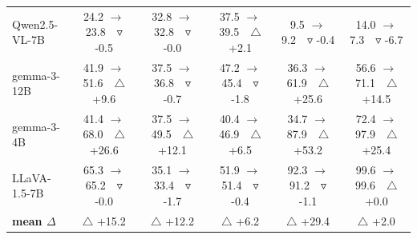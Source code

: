 \begin{table}[h]
\begin{tabular}{lccccc}
Qwen2.5-VL-7B & 24.2 $\to$ 23.8~~\textcolor{green!60!black}{$\triangledown$ -0.5} & 32.8 $\to$ 32.8~~\textcolor{green!60!black}{$\triangledown$ -0.0} & 37.5 $\to$ 39.5~~\textcolor{red!70!black}{$\triangle$ +2.1} & 9.5 $\to$ 9.2~~\textcolor{green!60!black}{$\triangledown$ -0.4} & 14.0 $\to$ 7.3~~\textcolor{green!60!black}{$\triangledown$ -6.7} \\
gemma-3-12B & 41.9 $\to$ 51.6~~\textcolor{red!70!black}{$\triangle$ +9.6} & 37.5 $\to$ 36.8~~\textcolor{green!60!black}{$\triangledown$ -0.7} & 47.2 $\to$ 45.4~~\textcolor{green!60!black}{$\triangledown$ -1.8} & 36.3 $\to$ 61.9~~\textcolor{red!70!black}{$\triangle$ +25.6} & 56.6 $\to$ 71.1~~\textcolor{red!70!black}{$\triangle$ +14.5} \\
gemma-3-4B & 41.4 $\to$ 68.0~~\textcolor{red!70!black}{$\triangle$ +26.6} & 37.5 $\to$ 49.5~~\textcolor{red!70!black}{$\triangle$ +12.1} & 40.4 $\to$ 46.9~~\textcolor{red!70!black}{$\triangle$ +6.5} & 34.7 $\to$ 87.9~~\textcolor{red!70!black}{$\triangle$ +53.2} & 72.4 $\to$ 97.9~~\textcolor{red!70!black}{$\triangle$ +25.4} \\
LLaVA-1.5-7B & 65.3 $\to$ 65.2~~\textcolor{green!60!black}{$\triangledown$ -0.0} & 35.1 $\to$ 33.4~~\textcolor{green!60!black}{$\triangledown$ -1.7} & 51.9 $\to$ 51.4~~\textcolor{green!60!black}{$\triangledown$ -0.4} & 92.3 $\to$ 91.2~~\textcolor{green!60!black}{$\triangledown$ -1.1} & 99.6 $\to$ 99.6~~\textcolor{red!70!black}{$\triangle$ +0.0} \\
\midrule
\textbf{mean $\Delta$} & \textcolor{red!70!black}{$\triangle$ +15.2} & \textcolor{red!70!black}{$\triangle$ +12.2} & \textcolor{red!70!black}{$\triangle$ +6.2} & \textcolor{red!70!black}{$\triangle$ +29.4} & \textcolor{red!70!black}{$\triangle$ +2.0} \\
\bottomrule
\end{tabular}
\end{table}
